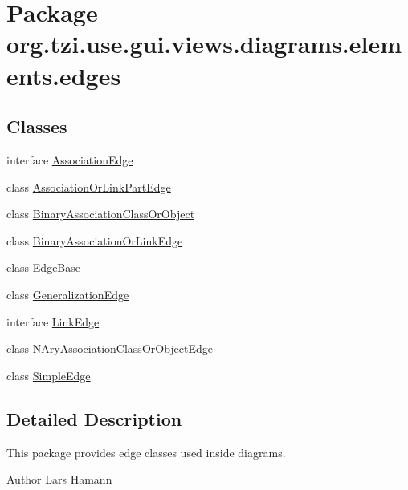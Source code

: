 \hypertarget{namespaceorg_1_1tzi_1_1use_1_1gui_1_1views_1_1diagrams_1_1elements_1_1edges}{\section{Package org.\-tzi.\-use.\-gui.\-views.\-diagrams.\-elements.\-edges}
\label{namespaceorg_1_1tzi_1_1use_1_1gui_1_1views_1_1diagrams_1_1elements_1_1edges}
}
\subsection*{Classes}
\begin{DoxyCompactItemize}
\item 
interface \hyperlink{interfaceorg_1_1tzi_1_1use_1_1gui_1_1views_1_1diagrams_1_1elements_1_1edges_1_1_association_edge}{Association\-Edge}
\item 
class \hyperlink{classorg_1_1tzi_1_1use_1_1gui_1_1views_1_1diagrams_1_1elements_1_1edges_1_1_association_or_link_part_edge}{Association\-Or\-Link\-Part\-Edge}
\item 
class \hyperlink{classorg_1_1tzi_1_1use_1_1gui_1_1views_1_1diagrams_1_1elements_1_1edges_1_1_binary_association_class_or_object}{Binary\-Association\-Class\-Or\-Object}
\item 
class \hyperlink{classorg_1_1tzi_1_1use_1_1gui_1_1views_1_1diagrams_1_1elements_1_1edges_1_1_binary_association_or_link_edge}{Binary\-Association\-Or\-Link\-Edge}
\item 
class \hyperlink{classorg_1_1tzi_1_1use_1_1gui_1_1views_1_1diagrams_1_1elements_1_1edges_1_1_edge_base}{Edge\-Base}
\item 
class \hyperlink{classorg_1_1tzi_1_1use_1_1gui_1_1views_1_1diagrams_1_1elements_1_1edges_1_1_generalization_edge}{Generalization\-Edge}
\item 
interface \hyperlink{interfaceorg_1_1tzi_1_1use_1_1gui_1_1views_1_1diagrams_1_1elements_1_1edges_1_1_link_edge}{Link\-Edge}
\item 
class \hyperlink{classorg_1_1tzi_1_1use_1_1gui_1_1views_1_1diagrams_1_1elements_1_1edges_1_1_n_ary_association_class_or_object_edge}{N\-Ary\-Association\-Class\-Or\-Object\-Edge}
\item 
class \hyperlink{classorg_1_1tzi_1_1use_1_1gui_1_1views_1_1diagrams_1_1elements_1_1edges_1_1_simple_edge}{Simple\-Edge}
\end{DoxyCompactItemize}


\subsection{Detailed Description}
This package provides edge classes used inside diagrams. \begin{DoxyAuthor}{Author}
Lars Hamann 
\end{DoxyAuthor}
